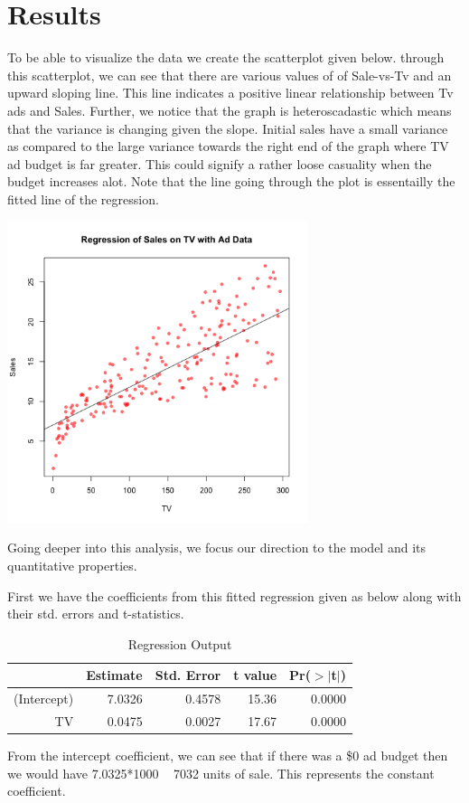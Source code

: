 \documentclass{article}
\begin{document}
\section{Results}
To be able to visualize the data we create the scatterplot given below. through this scatterplot, we can see that there are various values of of Sale-vs-Tv and an upward sloping line. This line indicates a positive linear relationship between Tv ads and Sales. Further, we notice that the graph is heteroscadastic which means that the variance is changing given the slope. Initial sales have a small variance as compared to the large variance towards the right end of the graph where TV ad budget is far greater. This could signify a rather loose casuality when the budget increases alot. Note that the line going through the plot is essentailly the fitted line of the regression.

\begin{center}
\includegraphics[width=250pt]{images/scatterplot-tv-sales.png}
\end{center}

Going deeper into this analysis, we focus our direction to the model and its quantitative properties. 

First we have the coefficients from this fitted regression given as below along with their std. errors and t-statistics.

\begin{table}[ht]
\centering
\begin{tabular}{rrrrr}
  \hline
 & Estimate & Std. Error & t value & Pr($>$$|$t$|$) \\ 
  \hline
(Intercept) & 7.0326 & 0.4578 & 15.36 & 0.0000 \\ 
  TV & 0.0475 & 0.0027 & 17.67 & 0.0000 \\ 
   \hline
\end{tabular}
\caption{Regression Output} 
\end{table}
From the intercept coefficient, we can see that if there was a \$0 ad budget then we would have 7.0325*1000 ~ 7032 units of sale. This represents the constant coefficient.
\end{document}
